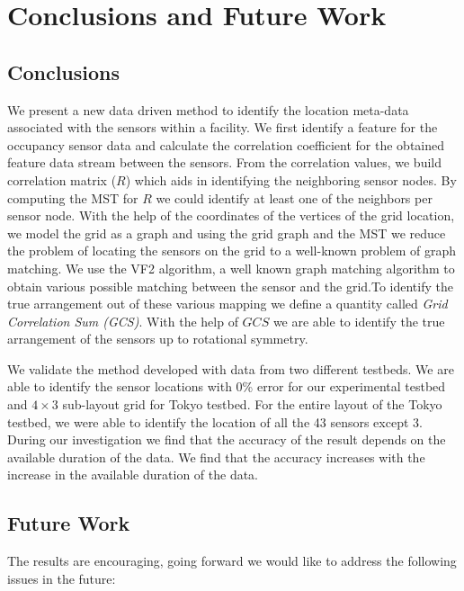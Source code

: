 \chapter{Conclusions and Future Work}
\label{chp:conclusionsandfuturework}

\section{Conclusions}

We present a new data driven method to identify the location meta-data associated with the sensors within a facility. 
We first identify a feature for the occupancy sensor data and calculate the correlation coefficient for the obtained feature data stream between the sensors.
 From the correlation values, we build correlation matrix ($R$)  which aids in identifying the neighboring sensor nodes.
By computing the MST for $R$ we could identify at least one of the neighbors per sensor node.
With the help of the coordinates of the vertices of the grid location, we model the grid as a graph and using the grid graph and the MST we reduce the problem of locating the sensors on the grid to a well-known problem of graph matching.
We use the VF2 algorithm, a well known graph matching algorithm to obtain various possible matching between the sensor and the grid.To identify the true arrangement out of these various mapping we define a quantity called \textit{Grid Correlation Sum (GCS)}.
With the help of $GCS$ we are able to identify the true arrangement of the sensors up to rotational symmetry. 

We validate the method developed with data from two different testbeds. We are able to identify the sensor locations with 0\% error for our experimental testbed and $4\times3$ sub-layout grid for Tokyo testbed.
For the entire layout of the Tokyo testbed, we were able to identify the location of all the 43 sensors except 3.
 During our investigation we find that the accuracy of the result depends on the available duration of the data.
We find that the accuracy increases with the increase in the available duration of the data.


\section{Future Work}
The results are encouraging, going forward we would like to address the following issues in the future:

